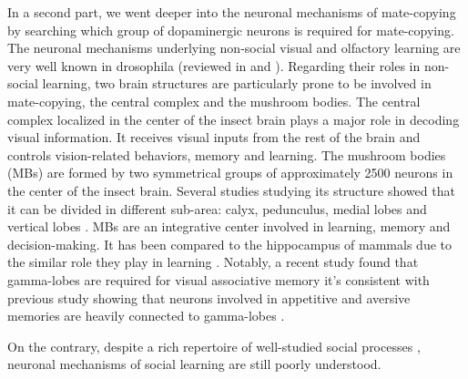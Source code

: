 \documentclass[a4paper, 12pt]{article}
\begin{document}
In a second part, we went deeper into the neuronal mechanisms of mate-copying by searching which group of dopaminergic neurons is required for mate-copying. The neuronal mechanisms underlying non-social visual and olfactory learning are very well known in drosophila (reviewed in \textcite{ guo_vision_2017} and \textcite{cognigni_right_2018}). Regarding their roles in non-social learning, two brain structures are particularly prone to be involved in mate-copying, the central complex and the mushroom bodies. The central complex localized in the center of the insect brain plays a major role in decoding visual information. It receives visual inputs from the rest of the brain and controls vision-related behaviors, memory and learning. The mushroom bodies (MBs) are formed by two symmetrical groups of approximately 2500 neurons in the center of the insect brain. Several studies studying its structure showed that it can be divided in different sub-area: calyx, pedunculus, medial lobes and vertical lobes \parencite{aso_neuronal_2014}. MBs are an integrative center involved in learning, memory and decision-making. It has been compared to the hippocampus of mammals due to the similar role they play in learning \parencite{strausfeld_evolution_1998}.	Notably, a recent study found that gamma-lobes are required for visual associative memory \parencite{ vogt_shared_2014} it's consistent with previous study showing that neurons involved in appetitive and aversive memories are heavily connected to gamma-lobes \parencite{claridge-chang_writing_2009, burke_layered_2012}.
	
On the contrary, despite a rich repertoire of well-studied social processes \parencite{pasquaretta_how_2016, teseo_fighting_2016, dawson_social_2018}, neuronal mechanisms of social learning are still poorly understood. 
\end{document}
